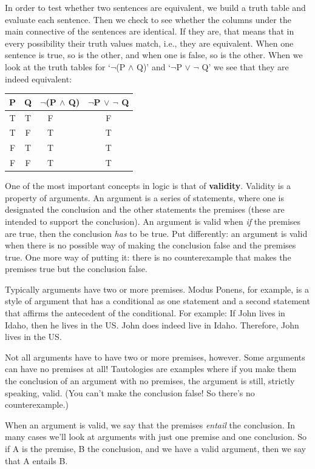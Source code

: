 \documentclass[]{tufte-book}
\begin{document}
In order to test whether two sentences are equivalent, we build a truth table and evaluate each sentence. Then we check to see whether the columns under the main connective of the sentences are identical. If they are, that means that in every possibility their truth values match, i.e., they are equivalent. When one sentence is true, so is the other, and when one is false, so is the other. When we look at the truth tables for `\(\neg\)(P \(\wedge\) Q)' and `\(\neg\)P \(\vee\) \(\neg\) Q' we see that they are indeed equivalent:

\begin{longtable}[]{@{}cccc@{}}
\toprule
P & Q & \(\neg\)(P \(\wedge\) Q) & \(\neg\)P \(\vee\) \(\neg\) Q\tabularnewline
\midrule
\endhead
T & T & F\(~~~~~~~~~~\) & F\tabularnewline
T & F & T\(~~~~~~~~~~\) & T\tabularnewline
F & T & T\(~~~~~~~~~~\) & T\tabularnewline
F & F & T\(~~~~~~~~~~\) & T\tabularnewline
\bottomrule
\end{longtable}

One of the most important concepts in logic is that of \textbf{validity}. Validity is a property of arguments. An argument is a series of statements, where one is designated the conclusion and the other statements the premises (these are intended to support the conclusion). An argument is valid when \emph{if} the premises are true, then the conclusion \emph{has} to be true. Put differently: an argument is valid when there is no possible way of making the conclusion false and the premises true. One more way of putting it: there is no counterexample that makes the premises true but the conclusion false.

Typically arguments have two or more premises. Modus Ponens, for example, is a style of argument that has a conditional as one statement and a second statement that affirms the antecedent of the conditional. For example: If John lives in Idaho, then he lives in the US. John does indeed live in Idaho. Therefore, John lives in the US.

Not all arguments have to have two or more premises, however. Some arguments can have no premises at all! Tautologies are examples where if you make them the conclusion of an argument with no premises, the argument is still, strictly speaking, valid. (You can't make the conclusion false! So there's no counterexample.)

When an argument is valid, we say that the premises \emph{entail} the conclusion. In many cases we'll look at arguments with just one premise and one conclusion. So if A is the premise, B the conclusion, and we have a valid argument, then we say that A entails B.
\end{document}
